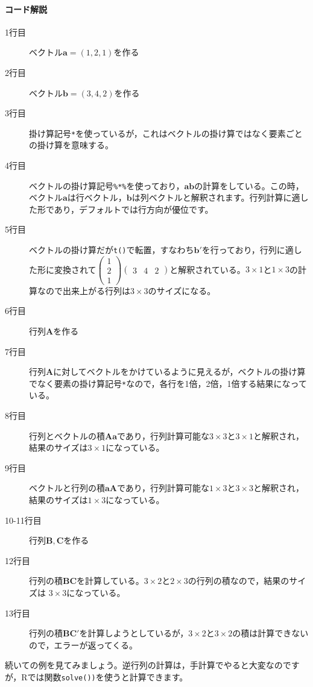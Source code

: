 \documentclass{ltjsbook}
\begin{document}
\paragraph{コード解説}
\begin{description}
    \item[1行目] ベクトル$\bm{a}=(1,2,1)$を作る
    \item[2行目] ベクトル$\bm{b}=(3,4,2)$を作る
    \item[3行目] 掛け算記号\verb|*|を使っているが，これはベクトルの掛け算ではなく要素ごとの掛け算を意味する。
    \item[4行目] ベクトルの掛け算記号\verb|%*%|を使っており，$\bm{ab}$の計算をしている。この時，ベクトル$\bm{a}$は行ベクトル，$\bm{b}$は列ベクトルと解釈されます。行列計算に適した形であり，デフォルトでは行方向が優位です。
    \item[5行目] ベクトルの掛け算だが\texttt{t()}で転置，すなわち$\bm{b}'$を行っており，行列に適した形に変換されて$\begin{pmatrix}1\\2\\1\end{pmatrix}\begin{pmatrix}3&4&2\end{pmatrix}$と解釈されている。$3\times1$と$1\times3$の計算なので出来上がる行列は$3\times3$のサイズになる。
    \item[6行目] 行列$\bm{A}$を作る
    \item[7行目] 行列$\bm{A}$に対してベクトルをかけているように見えるが，ベクトルの掛け算でなく要素の掛け算記号\verb|*|なので，各行を1倍，2倍，1倍する結果になっている。
    \item[8行目] 行列とベクトルの積$\bm{Aa}$であり，行列計算可能な$3\times3$と$3\times1$と解釈され，結果のサイズは$3 \times 1$になっている。
    \item[9行目] ベクトルと行列の積$\bm{aA}$であり，行列計算可能な$1 \times 3$と$3 \times 3$と解釈され，結果のサイズは$1 \times 3$になっている。
    \item[10-11行目] 行列$\bm{B,C}$を作る
    \item[12行目] 行列の積$\bm{BC}$を計算している。$3\times2$と$2\times3$の行列の積なので，結果のサイズは $3\times3$になっている。
    \item[13行目] 行列の積$\bm{BC'}$を計算しようとしているが，$3\times2$と$3\times2$の積は計算できないので，エラーが返ってくる。
\end{description}

続いての例を見てみましょう。逆行列の計算は，手計算でやると大変なのですが，Rでは関数\texttt{solve())}を使うと計算できます。
\end{document}

